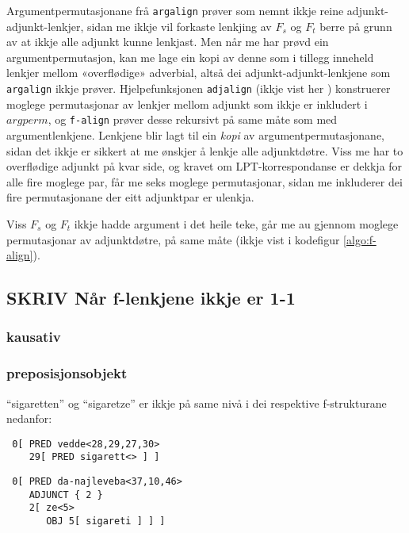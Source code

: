 \documentclass[11pt,a4paper,oneside,draft]{book}
\begin{document}
Argumentpermutasjonane frå \texttt{argalign} prøver som nemnt ikkje reine
adjunkt-adjunkt-lenkjer, sidan me ikkje vil forkaste lenkjing av $F_s$
og $F_t$ berre på grunn av at ikkje alle adjunkt kunne lenkjast. Men
når me har prøvd ein argumentpermutasjon, kan me lage ein kopi av
denne som i tillegg inneheld lenkjer mellom «overflødige» adverbial,
altså dei adjunkt-adjunkt-lenkjene som \texttt{argalign} ikkje
prøver. Hjelpefunksjonen \texttt{adjalign} (ikkje vist her
) konstruerer moglege
permutasjonar av lenkjer mellom adjunkt som ikkje er inkludert i
$argperm$, og \texttt{f-align} prøver desse rekursivt på same måte som med
argumentlenkjene.  Lenkjene blir lagt til ein
\emph{kopi} av argumentpermutasjonane, sidan det ikkje er sikkert at me
ønskjer å lenkje alle adjunktdøtre. Viss me har to overflødige adjunkt
på kvar side, og kravet om LPT-korrespondanse er dekkja for alle fire
moglege par, får me seks moglege permutasjonar, sidan me inkluderer
dei fire permutasjonane der eitt adjunktpar er ulenkja.

Viss $F_s$ og $F_t$ ikkje hadde argument i det heile teke, går me au
gjennom moglege permutasjonar av adjunktdøtre, på same måte (ikkje
vist i kodefigur \ref{algo:f-align}).

\subsection{\textbf{SKRIV} Når f-lenkjene ikkje er 1-1}
\label{sec-4.1.2}

\subsubsection{kausativ}
\label{sec-4.1.2.1}

\subsubsection{preposisjonsobjekt}
\label{sec-4.1.2.2}

``sigaretten'' og ``sigaretze'' er ikkje på same nivå i dei respektive
f-strukturane nedanfor:
\begin{verbatim}
 0[ PRED vedde<28,29,27,30>
    29[ PRED sigarett<> ] ]
\end{verbatim}


\begin{verbatim}
 0[ PRED da-najleveba<37,10,46>
    ADJUNCT { 2 }
    2[ ze<5>
       OBJ 5[ sigareti ] ] ]
\end{verbatim}
\end{document}
